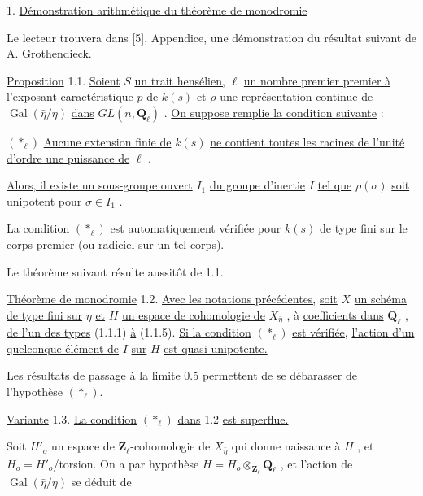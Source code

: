 1.  \underline{Démonstration arithmétique du théorème de monodromie}

Le lecteur trouvera dans  [5], Appendice, une démonstration du résultat suivant de A. Grothendieck.

\underline{Proposition} 1.1.  \underline{Soient}  $S$  \underline{un trait hensélien,}  $\ell$  \underline{un nombre premier premier à l'exposant caractéristique}  $p$  \underline{de}  $k(s)$  \underline{et}  $\rho$  \underline{une représentation continue de}  $\operatorname{Gal}(\bar\eta/\eta)$  \underline{dans}  $GL(n,\mathbf{Q}_\ell)$ . \underline{On suppose remplie la condition suivante} :

$(*_\ell)$      \underline{Aucune extension finie de}  $k(s)$  \underline{ne contient toutes les racines de l'unité d'ordre une puissance de}  $\ell$ .



\underline{Alors, il existe un sous-groupe ouvert}  $I_1$  \underline{du groupe d'inertie}  $I$  \underline{tel que}  $\rho(\sigma)$  \underline{soit unipotent pour}  $\sigma \in I_1$ .

La condition  $(*_\ell)$  est automatiquement vérifiée pour  $k(s)$  de type fini sur le corps premier (ou radiciel sur un tel corps).

Le théorème suivant résulte aussitôt de 1.1.

\underline{Théorème de monodromie} 1.2.  \underline{Avec les notations précédentes,} \underline{soit}  $X$  \underline{un schéma de type fini sur}  $\eta$  \underline{et}  $H$  \underline{un espace de cohomologie de}  $X_{\bar\eta}$ , à \underline{coefficients dans}  $\mathbf{Q}_\ell$ , \underline{de  l'un des types} (1.1.1) \underline{à} (1.1.5). \underline{Si la condition}  $(*_\ell)$  \underline{est vérifiée,} \underline{l'action d'un quelconque élément de}  $I$  \underline{sur}  $H$  \underline{est quasi-unipotente.}

Les résultats de passage à la limite 0.5 permettent de se débarasser de l'hypothèse  $(*_\ell)$.

\underline{Variante} 1.3.  \underline{La condition}  $(*_\ell)$  \underline{dans} 1.2 \underline{est superflue.}

Soit  $H'_o$  un espace de  $\mathbf{Z}_\ell$-cohomologie de  $X_{\bar\eta}$  qui donne naissance à  $H$ , et  $H_o = H'_o$/torsion. On a par hypothèse  $H = H_o \otimes_{\mathbf{Z}_\ell} \mathbf{Q}_\ell$ , et l'action de  $\operatorname{Gal}(\bar\eta/\eta)$  se déduit de

